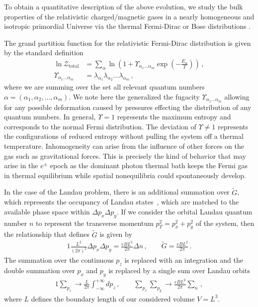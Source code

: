\label{sec:partition}
\noindent To obtain a quantitative description of the above evolution, we study the bulk properties of the relativistic charged/magnetic gases in a nearly homogeneous and isotropic primordial Universe via the thermal Fermi-Dirac or Bose distributions .

The grand partition function for the relativistic Fermi-Dirac distribution is given by the standard definition~\cite{Elze:1980er}
\begin{align}
 \label{part:1} \ln\mathcal{Z}_\mathrm{total} &= \sum_{\alpha}\ln\left(1+\Upsilon_{\alpha_{1}\ldots\alpha_{m}}\exp\left(-\frac{E_{\alpha}}{T}\right)\right)\,,\\
 \Upsilon_{\alpha_{1}\ldots\alpha_{m}} &= \lambda_{\alpha_{1}}\lambda_{\alpha_{2}}\ldots\lambda_{\alpha_{m}}\,,
\end{align}
where we are summing over the set all relevant quantum numbers $\alpha=(\alpha_{1},\alpha_{2},\ldots,\alpha_{m})$. We note here the generalized the fugacity $\Upsilon_{\alpha_{1}\ldots\alpha_{m}}$ allowing for any possible deformation caused by pressures effecting the distribution of any quantum numbers. In general, $\Upsilon=1$ represents the maximum entropy and corresponds to the normal Fermi distribution. The deviation of $\Upsilon\neq1$ represents the configurations of reduced entropy without pulling the system off a thermal temperature. Inhomogeneity can arise from the influence of other forces on the gas such as gravitational forces. This is precisely the kind of behavior that may arise in the $e^{\pm}$ epoch as the dominant photon thermal bath keeps the Fermi gas in thermal equilibrium while spatial nonequilibria could spontaneously develop.

In the case of the Landau problem, there is an additional summation over $\widetilde{G}$, which represents the occupancy of Landau states~\cite{greiner2012thermodynamics}, which are matched to the available phase space within $\Delta p_{x}\Delta p_{y}$. If we consider the orbital Landau quantum number $n$ to represent the transverse momentum $p_{T}^{2}=p_{x}^{2}+p_{y}^{2}$ of the system, then the relationship that defines $\widetilde{G}$ is given by
\begin{alignat}{1}
 \label{phase:1} \frac{L^{2}}{(2\pi)^{2}}\Delta p_{x}\Delta p_{y}=\frac{eBL^{2}}{2\pi}\Delta n\,,\qquad\widetilde{G}=\frac{eBL^{2}}{2\pi}\,.
\end{alignat}
The summation over the continuous $p_{z}$ is replaced with an integration and the double summation over $p_{x}$ and $p_{y}$ is replaced by a single sum over Landau orbits
\begin{alignat}{1}
 \label{phase:2}
 \sum_{p_{z}}\rightarrow\frac{L}{2\pi}\int^{+\infty}_{-\infty}dp_{z}\,,\qquad\sum_{p_{x}}\sum_{p_{y}}\rightarrow\frac{eBL^{2}}{2\pi}\sum_{n}\,,
\end{alignat}
where $L$ defines the boundary length of our considered volume $V=L^{3}$.

